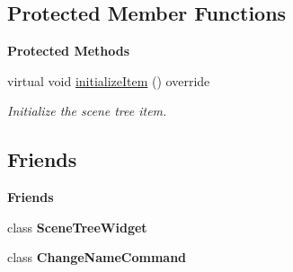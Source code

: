 \subsection*{Protected Member Functions}
\begin{Indent}\textbf{ Protected Methods}\par
\begin{DoxyCompactItemize}
\item 
\mbox{\label{classrev_1_1_view_1_1_scene_related_item_a6a079cc97c2a951e0f0024f986414e57}} 
virtual void \mbox{\hyperlink{classrev_1_1_view_1_1_scene_related_item_a6a079cc97c2a951e0f0024f986414e57}{initialize\+Item}} () override
\begin{DoxyCompactList}\small\item\em Initialize the scene tree item. \end{DoxyCompactList}\end{DoxyCompactItemize}
\end{Indent}
\subsection*{Friends}
\begin{Indent}\textbf{ Friends}\par
\begin{DoxyCompactItemize}
\item 
\mbox{\label{classrev_1_1_view_1_1_scene_related_item_a7344590eec6f1dd285680c820ab5ccd8}} 
class {\bfseries Scene\+Tree\+Widget}
\item 
\mbox{\label{classrev_1_1_view_1_1_scene_related_item_aa41b68269cd44d1f91ce51d36172e067}} 
class {\bfseries Change\+Name\+Command}
\end{DoxyCompactItemize}
\end{Indent}
